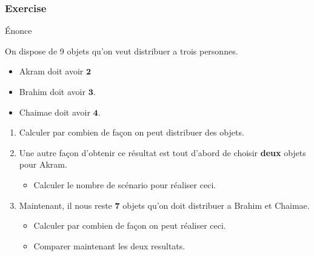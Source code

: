 \documentclass{beamer}
\begin{document}
\begin{frame}[<+->]
  \frametitle{Exercise}
  \begin{block}{Énonce}
  \scriptsize
    
    On dispose de 9 objets qu'on veut distribuer a trois personnes.
    \begin{itemize}
    \scriptsize
      \item Akram doit avoir $\mathbf{2}$
    \item Brahim doit avoir $\mathbf{3}$.
    \item Chaimae doit avoir $\mathbf{4}$.
    \end{itemize}
  \end{block}
 \begin{enumerate}
   \item Calculer par combien de façon on peut distribuer des objets.\\[1cm]
   \item Une autre façon d'obtenir ce résultat est tout d'abord de choisir
   \textbf{deux} objets pour Akram. 
   \begin{itemize}
     \item Calculer le nombre de scénario pour réaliser ceci.\\[4pt]
   \end{itemize}
   \item Maintenant, il nous reste $\mathbf{7}$ objets qu'on doit distribuer a
   Brahim et Chaimae.
   \begin{itemize}
     \item Calculer par combien de façon on peut réaliser ceci.\\[4pt]
     \item Comparer maintenant les deux resultats.
   \end{itemize}
 \end{enumerate} 
\end{frame}
\end{document}

